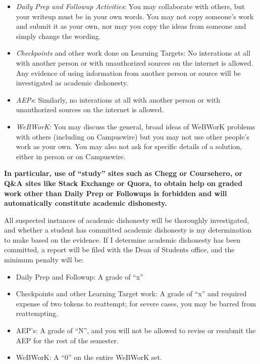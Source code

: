 \documentclass[]{article}
\providecommand{\tightlist}{%
  \setlength{\itemsep}{0pt}\setlength{\parskip}{0pt}}
\begin{document}
\begin{itemize}
\tightlist
\item
  \emph{Daily Prep and Followup Activities}: You may collaborate with
  others, but your writeup must be in your own words. You may not copy
  someone's work and submit it as your own, nor may you copy the ideas
  from someone and simply change the wording.
\item
  \emph{Checkpoints} and other work done on Learning Targets: No
  interations at all with another person or with unauthorized sources on
  the internet is allowed. Any evidence of using information from
  another person or source will be investigated as academic dishonesty.
\item
  \emph{AEPs}: Similarly, no interations at all with another person or
  with unauthorized sources on the internet is allowed.
\item
  \emph{WeBWorK}: You may discuss the general, broad ideas of WeBWorK
  problems with others (including on Campuswire) but you may not use
  other people's work as your own. You may also not ask for specific
  details of a solution, either in person or on Campuswire.
\end{itemize}

\textbf{In particular, use of ``study'' sites such as Chegg or
Coursehero, or Q\&A sites like Stack Exchange or Quora, to obtain help
on graded work other than Daily Prep or Followups is forbidden and will
automatically constitute academic dishonesty.}

All suspected instances of academic dishonesty will be thoroughly
investigated, and whether a student has committed academic dishonesty is
my determination to make based on the evidence. If I determine academic
dishonesty has been committed, a report will be filed with the Dean of
Students office, and the minimum penalty will be:

\begin{itemize}
\tightlist
\item
  Daily Prep and Followup: A grade of ``x''
\item
  Checkpoints and other Learning Target work: A grade of ``x'' and
  required expense of two tokens to reattempt; for severe cases, you may
  be barred from reattempting.
\item
  AEP's: A grade of ``N'', and you will not be allowed to revise or
  resubmit the AEP for the rest of the semester.
\item
  WeBWorK: A ``0'' on the entire WeBWorK set.
\end{itemize}
\end{document}
